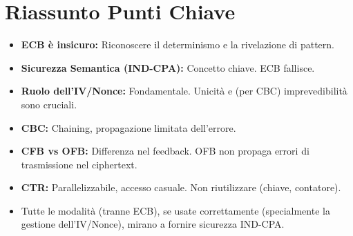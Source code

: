 \documentclass{article}
\begin{document}
\section{Riassunto Punti Chiave}
\begin{itemize}
    \item \textbf{ECB è insicuro:} Riconoscere il determinismo e la rivelazione di pattern.
    \item \textbf{Sicurezza Semantica (IND-CPA):} Concetto chiave. ECB fallisce.
    \item \textbf{Ruolo dell'IV/Nonce:} Fondamentale. Unicità e (per CBC) imprevedibilità sono cruciali.
    \item \textbf{CBC:} Chaining, propagazione limitata dell'errore.
    \item \textbf{CFB vs OFB:} Differenza nel feedback. OFB non propaga errori di trasmissione nel ciphertext.
    \item \textbf{CTR:} Parallelizzabile, accesso casuale. Non riutilizzare (chiave, contatore).
    \item Tutte le modalità (tranne ECB), se usate correttamente (specialmente la gestione dell'IV/Nonce), mirano a fornire sicurezza IND-CPA.
\end{itemize}
\end{document}
